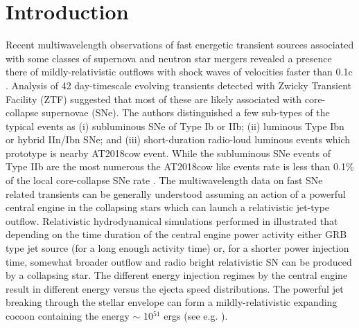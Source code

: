 \documentclass[a4paper]{jpconf}
\begin{document}
\section{Introduction} 
Recent multiwavelength observations of fast energetic transient sources associated with some classes of supernova and neutron star mergers revealed a presence there of mildly-relativistic outflows with shock waves of velocities faster than 0.1c \citep{2016ApJ...819...35A,2019ApJ...872...18M,2020ApJ...895...49H,2021ApJ...912L...9N,2019LRR....23....1M,2021ARA&A..59..155M,2021ApJ...911..104K,2022ApJ...927L..17H}. 
Analysis of 42 day-timescale evolving transients detected with Zwicky Transient Facility (ZTF) \citep{ZTF_stat_Ho21} suggested that most of these are likely associated with core-collapse supernovae (SNe). The authors  distinguished a few sub-types of the typical events as   (i) subluminous SNe of Type Ib or IIb; (ii) luminous Type Ibn or hybrid IIn/Ibn SNe; and (iii) short-duration radio-loud luminous events which prototype is nearby AT2018cow event. While the subluminous SNe events of Type IIb are the most numerous the AT2018cow like events rate is less than 0.1\% of the local core-collapse SNe rate \citep{ZTF_stat_Ho21}. The multiwavelength data on fast SNe related transients can be generally understood assuming an action of a powerful central engine  in the collapsing stars which can launch a relativistic jet-type outflow. Relativistic hydrodynamical  simulations  performed in \citep{2012ApJ...750...68L,2021NewAR..9201614C} illustrated that depending on the time duration of the central engine power activity either GRB type jet source (for a long enough activity time) or, for a shorter power injection time, somewhat broader outflow and radio bright relativistic SN can be produced by a collapsing star. The different energy injection regimes by the central engine result in different energy versus the ejecta speed distributions. The powerful jet breaking through the stellar envelope can form  a mildly-relativistic expanding cocoon containing the energy $\sim$ 10$^{51}$ ergs (see e.g. \citep{2019ApJ...871L..25P}).    
\end{document}

